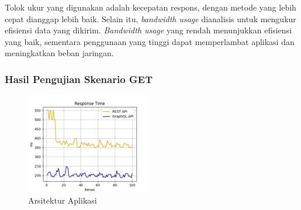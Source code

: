 \documentclass[
 manuscript=article,  %
  layout=publish, 
  year=2024, 
  month= Februari, %
  volume=8,
  number=1 
]{JIKO}
\begin{document}
Tolok ukur yang digunakan adalah kecepatan respons, dengan metode yang lebih cepat dianggap lebih baik. Selain itu, \textit{bandwidth usage} dianalisis untuk mengukur efisiensi data yang dikirim. \textit{Bandwidth usage} yang rendah menunjukkan efisiensi yang baik, sementara penggunaan yang tinggi dapat memperlambat aplikasi dan meningkatkan beban jaringan.

\subsubsection{Hasil Pengujian Skenario GET}


\noindent
\begin{minipage}{0.48\textwidth}
    \begin{figure}[H]
        \centering
        \includegraphics[width=\textwidth]{assets/Picture3.jpg}
        \caption{Arsitektur Aplikasi}
        \label{fig:arsitektur}
    \end{figure}
\end{minipage}%
\hspace{0.04\textwidth}
\end{document}
